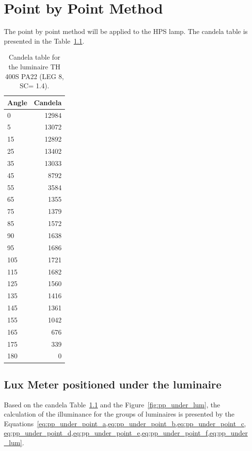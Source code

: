 \chapter{Point by Point Method}

The point by point method will be applied to the HPS lamp. The candela table is presented in the Table~\ref{tab:hps_candela}.

\begin{table}
\centering
\begin{tabular}{|l|r|}
  \hline
  \textbf{Angle} & \textbf{Candela} \\
  \hline
  0 & 12984 \\
  \hline
  5 & 13072 \\
  \hline
  15 & 12892 \\
  \hline
  25 & 13402 \\
  \hline
  35 & 13033 \\
  \hline
  45 & 8792 \\
  \hline
  55 & 3584 \\
  \hline
  65 & 1355 \\
  \hline
  75 & 1379 \\
  \hline
  85 & 1572 \\
  \hline
  90 & 1638 \\
  \hline
  95 & 1686 \\
  \hline
  105 & 1721 \\
  \hline
  115 & 1682 \\
  \hline
  125 & 1560 \\
  \hline
  135 & 1416 \\
  \hline
  145 & 1361 \\
  \hline
  155 & 1042 \\
  \hline
  165 & 676 \\
  \hline
  175 & 339 \\
  \hline
  180 & 0 \\
  \hline
\end{tabular}
\caption{Candela table for the luminaire TH 400S PA22 (LEG 8, SC= 1.4).}
\label{tab:hps_candela}
\end{table}

\section{Lux Meter positioned under the luminaire}
Based on the candela Table~\ref{tab:hps_candela} and the Figure~\ref{fig:pp_under_lum}, the calculation of the illuminance for the groups of luminaires is presented by the Equations~\cref{eq:pp_under_point_a,eq:pp_under_point_b,eq:pp_under_point_c,eq:pp_under_point_d,eq:pp_under_point_e,eq:pp_under_point_f,eq:pp_under_lum}.

